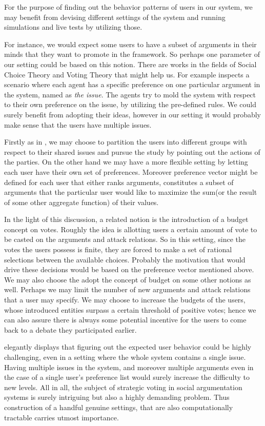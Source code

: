 \documentclass{article}
\begin{document}
For the purpose of finding out the behavior patterns of users in our system, we may benefit from devising different settings of the system and running simulations and live tests by utilizing those.  

For instance, we would expect some users to have a subset of arguments in their minds that they want to promote in the framework. So perhaps one parameter of our setting could be based on this notion. There are works in the fields of Social Choice Theory and Voting Theory that might help us. For example \cite{bonzonmaudet11} inspects a scenario where each agent has a specific preference on one particular argument in the system, named as \textit{the issue}. The agents try to mold the system with respect to their own preference on the issue, by utilizing the pre-defined rules. We could surely benefit from adopting their ideas, however in our setting it would probably make sense that the users have multiple issues. 

Firstly as in \cite{bonzonmaudet11}, we may choose to partition the users into different groups with respect to their shared issues and pursue the study by pointing out the actions of the parties. On the other hand we may have a more flexible setting by letting each user have their own set of preferences. Moreover preference vector might be defined for each user that either ranks arguments, constitutes a subset of arguments that the particular user would like to maximize the sum(or the result of some other aggregate function) of their values. 

In the light of this discussion, a related notion is the introduction of a budget concept on votes. Roughly the idea is allotting users a certain amount of vote to be casted on the arguments and attack relations. So in this setting, since the votes the users possess is finite, they are forced to make a set of rational selections between the available choices. Probably the motivation that would drive these decisions would be based on the preference vector mentioned above. 
We may also choose the adopt the concept of budget on some other notions as well. Perhaps we may limit the number of new arguments and attack relations that a user may specify. We may choose to increase the budgets of the users, whose introduced entities surpass a certain threshold of positive votes; hence we can also assure there is always some potential incentive for the users to come back to a debate they participated earlier. 

\cite{bonzonmaudet11} elegantly displays that figuring out the expected user behavior could be highly challenging, even in a setting where the whole system contains a single issue. Having multiple issues in the system, and moreover multiple arguments even in the case of a single user's preference list would surely increase the difficulty to new levels. All in all, the subject of strategic voting in social argumentation systems is surely intriguing but also a highly demanding problem. Thus construction of a handful genuine settings, that are also computationally tractable carries utmost importance.
\end{document}
